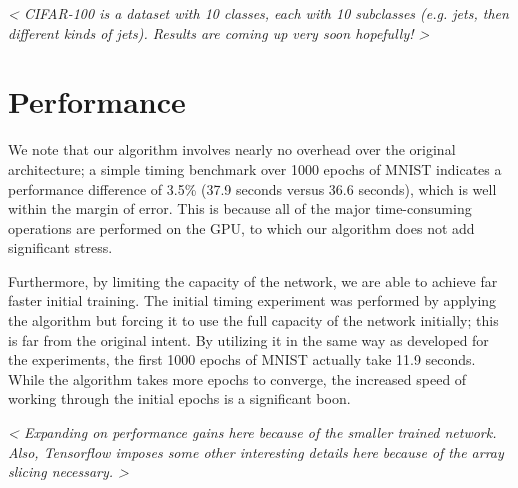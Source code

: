 \emph{ < CIFAR-100 is a dataset with 10 classes, each with 10 subclasses (e.g. jets, then different kinds of jets). Results are coming up very soon hopefully! > }

\section{Performance}
We note that our algorithm involves nearly no overhead over the original architecture; a simple timing benchmark over 1000 epochs of MNIST indicates a performance difference of 3.5\% (37.9 seconds versus 36.6 seconds), which is well within the margin of error.
This is because all of the major time-consuming operations are performed on the GPU, to which our algorithm does not add significant stress.


Furthermore, by limiting the capacity of the network, we are able to achieve far faster initial training.
The initial timing experiment was performed by applying the algorithm but forcing it to use the full capacity of the network initially; this is far from the original intent.
By utilizing it in the same way as developed for the experiments, the first 1000 epochs of MNIST actually take 11.9 seconds.
While the algorithm takes more epochs to converge, the increased speed of working through the initial epochs is a significant boon.

\emph{ < Expanding on performance gains here because of the smaller trained network. Also, Tensorflow imposes some other interesting details here because of the array slicing necessary. > }
